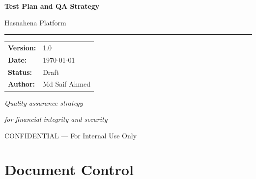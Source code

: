 \documentclass[11pt,a4paper]{article}
\newcommand{\DocumentTitle}{Test Plan and QA Strategy}
\newcommand{\DocumentSubtitle}{Hasnahena Platform}
\newcommand{\DocumentVersion}{1.0}
\newcommand{\DocumentDate}{\today}
\begin{document}
\begin{titlepage}
    \centering
    \vspace*{2cm}
    
    {\Huge\bfseries\color{primaryblue}\DocumentTitle\par}
    \vspace{0.5cm}
    {\LARGE\color{darkgray}\DocumentSubtitle\par}
    
    \vspace{1.5cm}
    
    {\color{primaryblue}\rule{10cm}{2pt}\par}
    
    \vspace{2cm}
    
    \begin{tabular}{ll}
        \textbf{Version:} & \DocumentVersion \\[0.5em]
        \textbf{Date:} & \DocumentDate \\[0.5em]
        \textbf{Status:} & Draft \\[0.5em]
        \textbf{Author:} & Md Saif Ahmed \\[0.5em]
    \end{tabular}
    
    \vfill
    
    {\large\color{darkgray}\textit{Quality assurance strategy}\par}
    {\large\color{darkgray}\textit{for financial integrity and security}\par}
    
    \vspace{1cm}
    
    {\footnotesize\color{darkgray}CONFIDENTIAL --- For Internal Use Only\par}
\end{titlepage}

\tableofcontents
\newpage

\section*{Document Control}
\end{document}
